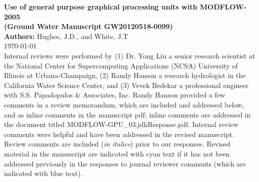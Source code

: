 \documentclass[12pt]{article} %
\begin{document}
\noindent
\textbf{Use of general purpose graphical processing units with MODFLOW-2005 \\ (Ground Water Manuscript GW20120518-0099) }\\

\noindent
\textbf{Authors:} Hughes, J.D., and White, J.T \\

\today \\

\noindent
Internal reviews were performed by (1) Dr. Yong Liu a senior research scientist at the National Center for Supercomputing Applications (NCSA) University of Illinois at Urbana-Champaign, (2) Randy Hanson a research hydrologist in the California Water Science Center, and (3) Vevek Bedekar a professional engineer with  S.S. Papadopulos \& Associates, Inc. Randy Hanson provided a few comments in a review memorandum, which are included and addressed below, and as inline comments in the manuscript pdf; inline comments are addressed in the document titled MODFLOW-GPU\_03.jdhResponse.pdf. Internal review comments were helpful and have been addressed in the revised manuscript. Review comments are included (\textit{in italics}) prior to our responses. Revised material in the manuscript are indicated with \color{cyan} cyan \color{black} text if it has not been addressed previously in the responses to journal reviewer comments (which are indicated with \color{blue} blue \color{black} text).
\end{document}

